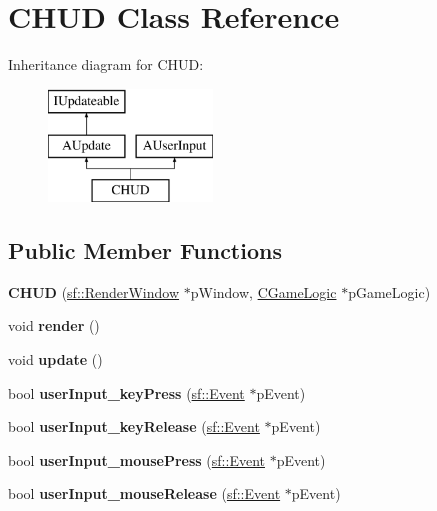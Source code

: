 \hypertarget{classCHUD}{\section{C\-H\-U\-D Class Reference}
\label{classCHUD}
}
Inheritance diagram for C\-H\-U\-D\-:\begin{figure}[H]
\begin{center}
\leavevmode
\includegraphics[height=3.000000cm]{classCHUD}
\end{center}
\end{figure}
\subsection*{Public Member Functions}
\begin{DoxyCompactItemize}
\item 
\hypertarget{classCHUD_ab519309240f9a867ac92d973cbeca0a5}{{\bfseries C\-H\-U\-D} (\hyperlink{classsf_1_1RenderWindow}{sf\-::\-Render\-Window} $\ast$p\-Window, \hyperlink{classCGameLogic}{C\-Game\-Logic} $\ast$p\-Game\-Logic)}\label{classCHUD_ab519309240f9a867ac92d973cbeca0a5}

\item 
\hypertarget{classCHUD_a992f78972db3fc54681ba720f3a08e9a}{void {\bfseries render} ()}\label{classCHUD_a992f78972db3fc54681ba720f3a08e9a}

\item 
\hypertarget{classCHUD_a598ee42887c834e6f6ffaf8d4be0723d}{void {\bfseries update} ()}\label{classCHUD_a598ee42887c834e6f6ffaf8d4be0723d}

\item 
\hypertarget{classCHUD_af2fb4b789ebabd8e12109c599f6039ea}{bool {\bfseries user\-Input\-\_\-key\-Press} (\hyperlink{classsf_1_1Event}{sf\-::\-Event} $\ast$p\-Event)}\label{classCHUD_af2fb4b789ebabd8e12109c599f6039ea}

\item 
\hypertarget{classCHUD_a229ff3daa4c721dfd72d12b94e43e89f}{bool {\bfseries user\-Input\-\_\-key\-Release} (\hyperlink{classsf_1_1Event}{sf\-::\-Event} $\ast$p\-Event)}\label{classCHUD_a229ff3daa4c721dfd72d12b94e43e89f}

\item 
\hypertarget{classCHUD_a592852471c152a8eeb4321250e4b5818}{bool {\bfseries user\-Input\-\_\-mouse\-Press} (\hyperlink{classsf_1_1Event}{sf\-::\-Event} $\ast$p\-Event)}\label{classCHUD_a592852471c152a8eeb4321250e4b5818}

\item 
\hypertarget{classCHUD_ad48f5d418a93d0e5767e6b95cc834827}{bool {\bfseries user\-Input\-\_\-mouse\-Release} (\hyperlink{classsf_1_1Event}{sf\-::\-Event} $\ast$p\-Event)}\label{classCHUD_ad48f5d418a93d0e5767e6b95cc834827}

\end{DoxyCompactItemize}
